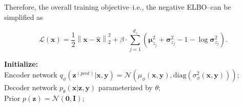 \documentclass{article}
\begin{document}
{Therefore, the overall training objective--i.e., the negative ELBO--can be simplified as


\begin{equation}\label{eq:final_loss}
\mathcal{L}(\mathbf{x}) = \frac{1}{2}
\left\| \mathbf{x} - \hat{\mathbf{x}} \right\|_2^2
+ \beta \cdot \sum_{j=1}^{d_z} \left( \mathbf{\mu}_{z_j}^2 + \mathbf{\sigma}_{z_j}^2 - 1 - \log \mathbf{\sigma}_{z_j}^2 \right).
\end{equation}



\begin{algorithm}[H]
\caption{Controllable VAE Training Procedure}
\label{algo:DVAE}

\textbf{Initialize:}\\
    Encoder network $q_{\phi}(\mathbf{z}^{(post)}|\mathbf{x, y}) = \mathcal{N}(\mu_{\phi}(\mathbf{x, y}), \text{diag}(\sigma_{\phi}^2(\mathbf{x, y})))$;\\
    Decoder network $p_{\theta}(\mathbf{x}|\mathbf{z, y})$ parameterized by $\theta$;\\
    Prior $p(\mathbf{z}) = \mathcal{N}(\mathbf{0, I})$;\\

\end{algorithm}}
\end{document}

